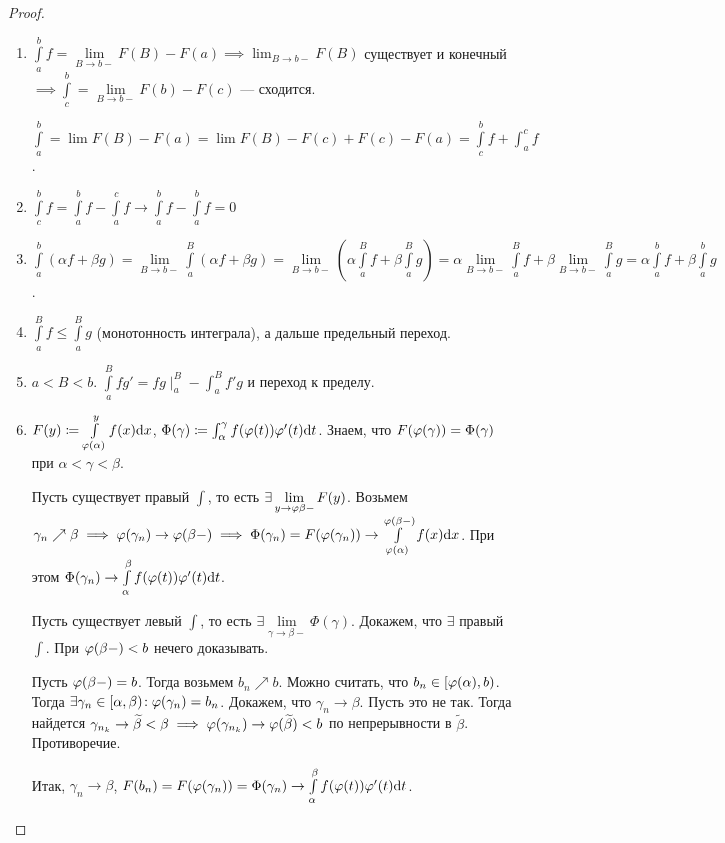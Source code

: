 \begin{proof}
    \begin{enumerate}
        \item $\int\limits_a^b f = \lim\limits_{B \to b-} F(B) - F(a) \implies \lim_{B \to b-}F(B)$ существует и конечный  $\implies \int\limits_c^b = \lim\limits_{B \to b-} F(b) - F(c)$ --- сходится.

            $\int\limits_a^b = \lim F(B) - F(a) = \lim F(B) - F(c) + F(c) - F(a) = \int\limits_c^b f + \int_a^c f$.
        \item $\int\limits_c^b f = \int\limits_a^b f- \int\limits_a^c f \to \int\limits_a^b f - \int\limits_a^b f = 0$
        \item $\int\limits_a^b (\alpha f + \beta g) = \lim\limits_{B \to b-} \int\limits_a^B(\alpha f + \beta g) = \lim\limits_{B \to b-}(\alpha \int\limits_a^B f + \beta \int\limits_a^B g) = \alpha \lim\limits_{B \to b-} \int\limits_a^B f + \beta\lim\limits_{B \to b-} \int\limits_a^B g = \alpha \int\limits_a^b f + \beta \int\limits_a^b g$.
        \item $\int\limits_a^B f \le \int\limits_a^B g$ (монотонность интеграла), а дальше предельный переход.
        \item $a < B < b$. $\int\limits_a^B fg' = fg \mid_a^B - \int_a^B f'g$ и переход к пределу.
        \item $F(y) \coloneqq \int\limits_{\varphi(\alpha)}^y f(x) \mathrm{d}x$,  $\Phi(\gamma) \coloneqq \int_{\alpha}^{\gamma} f(\varphi(t)) \varphi'(t) \mathrm{d}t$. Знаем, что $F(\varphi(\gamma)) = \Phi(\gamma)$ при  $\alpha < \gamma < \beta$.

            Пусть существует правый  $\int$, то есть  $\exists \lim\limits_{y \to \varphi{\beta-}} F(y)$. Возьмем  $\gamma_n \nearrow \beta \implies \varphi(\gamma_n) \to \varphi(\beta-) \implies \Phi(\gamma_n) = F(\varphi(\gamma_n)) \to \int\limits_{\varphi(\alpha)}^{\varphi(\beta-)} f(x) \mathrm{d}x$. При этом $\Phi(\gamma_n) \to \int\limits_{\alpha}^{\beta} f(\varphi(t))\varphi'(t)\mathrm{d}t$.

            Пусть существует левый $\int$, то есть  $\exists \lim\limits_{\gamma \to \beta-} \Phi(\gamma)$. Докажем, что  $\exists$ правый  $\int$. При  $\varphi(\beta-) < b$ нечего доказывать. 

            Пусть  $\varphi(\beta-) = b$. Тогда  возьмем $b_n \nearrow b$. Можно считать, что $b_n \in [\varphi(\alpha), b)$. Тогда $\exists \gamma_n \in [\alpha, \beta)\!: \varphi(\gamma_n) = b_n$. Докажем, что  $\gamma_n \to \beta$. Пусть это не так. Тогда найдется  $\gamma_{n_k} \to \widetilde{\beta} < \beta \implies \varphi(\gamma_{n_k}) \to \varphi(\widetilde{\beta}) < b$ по непрерывности в  $\widetilde{\beta}$. Противоречие.

            Итак,  $\gamma_n \to \beta$,  $F(b_n) = F(\varphi(\gamma_n)) = \Phi(\gamma_n) \to \int\limits_\alpha^\beta f(\varphi(t))\varphi'(t) \mathrm{d}t$.
    \end{enumerate}
\end{proof}
